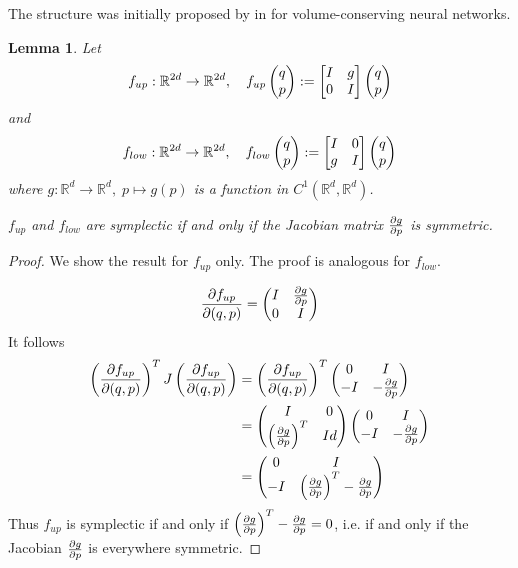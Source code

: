 \documentclass[twoside,a4paper]{article}
\newtheorem{lemma}{Lemma}
\begin{document}
The structure was initially proposed by \citeauthor{Deco1995} in \cite{Deco1995} 
 for volume-conserving neural networks.


\begin{lemma}\label{jacobi_symmetric}
	Let
	\begin{equation*}
		f_{up} : \mathbb{R}^{2d} \to \mathbb{R}^{2d},\quad
		f_{up} \qpvec := \uppersympop{g}
	\end{equation*}
	and
	\begin{equation*}
		f_{low} : \mathbb{R}^{2d} \to \mathbb{R}^{2d},\quad
		f_{low} \qpvec := \lowersympop{g}
	\end{equation*}
	where $g: \mathbb{R}^d \to \mathbb{R}^d,\; p \mapsto g(p)$ is a function in 
	$C^1(\mathbb{R}^d, \mathbb{R}^d)$. 

	$f_{up}$ and $f_{low}$ are symplectic if and only if the Jacobian matrix $\jac{g}{p}$
	is symmetric.
\end{lemma}
\begin{proof}
	We show the result for $f_{up}$ only. The proof is analogous for $f_{low}$.

	\begin{equation*}
		\deldel[f_{up}]{(q,p)} = \begin{pmatrix}
			I & \deldel[g]{p} \\
			0 & I
		\end{pmatrix}
	\end{equation*}
	It follows
	\begin{align*}
		\jacp{f_{up}}{(q,p)}^T J \jacp{f_{up}}{(q,p)} 
		&= \left(\deldel[f_{up}]{(q,p)}\right)^T \begin{pmatrix}
			0 & I \\
			-I & -\jac{g}{p}
		\end{pmatrix} \\
		&= \begin{pmatrix}
			I & 0 \\
			\jacp{g}{p}^T & Id
		\end{pmatrix} \begin{pmatrix}
			0 & I \\
			-I & -\jac{g}{p}
		\end{pmatrix} \\
		&= \begin{pmatrix}
			0 & I \\
			-I & \jacp{g}{p}^T-\jac{g}{p}
		\end{pmatrix}
	\end{align*}
	Thus $f_{up}$ is symplectic if and only if $\jacp{g}{p}^T-\jac{g}{p}=0$, 
	i.e. if and only if the Jacobian $\deldel[g]{p}$ is everywhere symmetric.
\end{proof}
\end{document}
